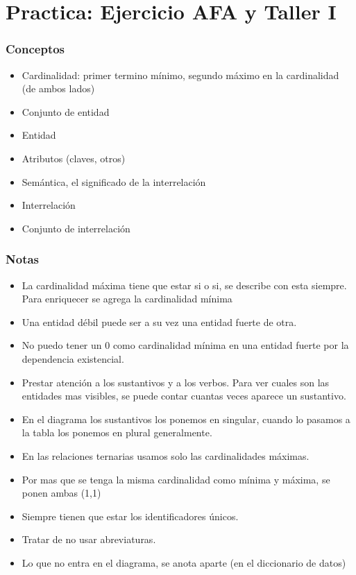 \section{Practica: Ejercicio AFA y Taller I}

\subsubsection*{Conceptos}
\begin{itemize}
\item Cardinalidad: primer termino mínimo, segundo máximo en la cardinalidad (de ambos lados)
\item Conjunto de entidad
\item Entidad
\item Atributos (claves, otros)
\item Semántica, el significado de la interrelación
\item Interrelación
\item Conjunto de interrelación
\end{itemize}


\subsubsection*{Notas}

\begin{itemize}
\item La cardinalidad máxima tiene que estar si o si, se describe con esta siempre. Para enriquecer se agrega la cardinalidad mínima
\item Una entidad débil puede ser a su vez una entidad fuerte de otra.
\item No puedo tener un 0 como cardinalidad mínima en una entidad fuerte por la dependencia existencial.
\item Prestar atención a los sustantivos y a los verbos. Para ver cuales son las entidades mas visibles, se puede contar cuantas veces aparece un sustantivo.
\item En el diagrama los sustantivos los ponemos en singular, cuando lo pasamos a la tabla los ponemos en plural generalmente.
\item En las relaciones ternarias usamos solo las cardinalidades máximas.
\item Por mas que se tenga la misma cardinalidad como mínima y máxima, se ponen ambas (1,1)
\item Siempre tienen que estar los identificadores únicos.
\item Tratar de no usar abreviaturas.
\item Lo que no entra en el diagrama, se anota aparte (en el diccionario de datos)
\end{itemize}



